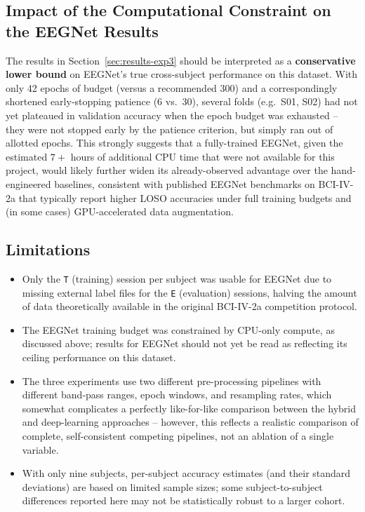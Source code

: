 \documentclass[11pt,a4paper]{article}
\begin{document}
\subsection{Impact of the Computational Constraint on the EEGNet Results}
The results in Section~\ref{sec:results-exp3} should be interpreted as a \textbf{conservative lower
bound} on EEGNet's true cross-subject performance on this dataset. With only 42 epochs of budget (versus a
recommended 300) and a correspondingly shortened early-stopping patience (6 vs.\ 30), several folds
(e.g.\ S01, S02) had not yet plateaued in validation accuracy when the epoch budget was exhausted --
they were not stopped early by the patience criterion, but simply ran out of allotted epochs. This
strongly suggests that a fully-trained EEGNet, given the estimated $7{+}$ hours of additional CPU time
that were not available for this project, would likely further widen its already-observed advantage
over the hand-engineered baselines, consistent with published EEGNet benchmarks on BCI-IV-2a that
typically report higher LOSO accuracies under full training budgets and (in some cases) GPU-accelerated
data augmentation.

\subsection{Limitations}
\begin{itemize}[leftmargin=1.2cm]
    \item Only the \texttt{T} (training) session per subject was usable for EEGNet due to missing
    external label files for the \texttt{E} (evaluation) sessions, halving the amount of data
    theoretically available in the original BCI-IV-2a competition protocol.
    \item The EEGNet training budget was constrained by CPU-only compute, as discussed above; results
    for EEGNet should not yet be read as reflecting its ceiling performance on this dataset.
    \item The three experiments use two different pre-processing pipelines with different band-pass
    ranges, epoch windows, and resampling rates, which somewhat complicates a perfectly like-for-like
    comparison between the hybrid and deep-learning approaches -- however, this reflects a realistic
    comparison of complete, self-consistent competing pipelines, not an ablation of a single
    variable.
    \item With only nine subjects, per-subject accuracy estimates (and their standard deviations) are
    based on limited sample sizes; some subject-to-subject differences reported here may not be
    statistically robust to a larger cohort.
\end{itemize}
\end{document}
